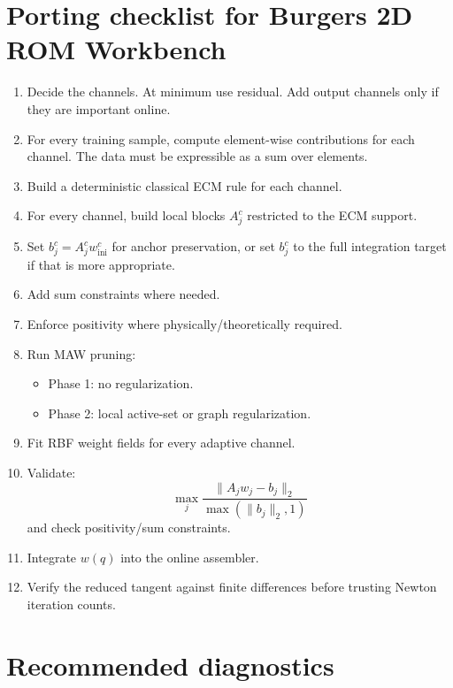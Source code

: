 \documentclass[11pt]{article}
\newcommand{\winit}{w_{\mathrm{ini}}}
\begin{document}
\section{Porting checklist for Burgers 2D ROM Workbench}

\begin{enumerate}[label=\arabic*.]
  \item Decide the channels.  At minimum use residual.  Add output channels only
  if they are important online.
  \item For every training sample, compute element-wise contributions for each channel.
  The data must be expressible as a sum over elements.
  \item Build a deterministic classical ECM rule for each channel.
  \item For every channel, build local blocks \(A_j^c\) restricted to the ECM support.
  \item Set \(b_j^c=A_j^c\winit^c\) for anchor preservation, or set \(b_j^c\) to the
  full integration target if that is more appropriate.
  \item Add sum constraints where needed.
  \item Enforce positivity where physically/theoretically required.
  \item Run MAW pruning:
  \begin{itemize}
    \item Phase 1: no regularization.
    \item Phase 2: local active-set or graph regularization.
  \end{itemize}
  \item Fit RBF weight fields for every adaptive channel.
  \item Validate:
  \[
    \max_j
    \frac{\|A_j w_j-b_j\|_2}{\max(\|b_j\|_2,1)}
  \]
  and check positivity/sum constraints.
  \item Integrate \(w(q)\) into the online assembler.
  \item Verify the reduced tangent against finite differences before trusting Newton
  iteration counts.
\end{enumerate}

\section{Recommended diagnostics}
\end{document}
